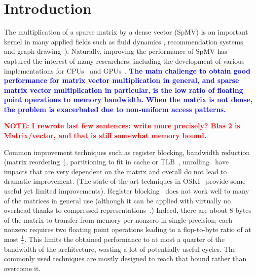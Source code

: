 \documentclass{sig-alternate}
\def\red#1{\textbf{\textcolor{red}{#1}}}
\def\blue#1{\textbf{\textcolor{blue}{#1}}}
\def\ge#1{{\blue{#1}}}
\def\NOTE#1{{\red{NOTE: #1}}}
\begin{document}
\section{Introduction}
The multiplication of a sparse matrix by a dense vector (SpMV) is an
important kernel in many applied fields such as fluid dynamics 
\cite{journals/tog/BolzFGS03}, recommendation systems~\cite{Brin98} and graph
drawing~\cite{Koren05}). Naturally, improving the performance of SpMV has
captured the interest of many researchers; including the development of
various implementations for 
CPUs~\cite{Buluc2009SPAA,Williams07} and GPUs~\cite{Bell08,
  conf/ipps/KreutzerHWFBB12,
  journals/concurrency/VazquezFG11,kumar2012accelerating}. \ge{The main
challenge  to obtain good performance for matrix vector multiplication in general, and 
sparse matrix vector multiplication in particular, is the low ratio of floating point operations
to memory bandwidth. When the matrix is not dense, the problem is exacerbated due to non-uniform 
access patterns.}

\NOTE{I rewrote last few sentences: write more precisely? Blas 2 is Matrix/vector, and that is still somewhat memory bound.}

Common improvement techniques such as register blocking, bandwidth
reduction (matrix reordering~\cite{Cuthill69}), partitioning to fit in
cache or TLB~\cite{Nishtala07,Temam:1992:CBS:147877.148091,conf/ppsc/Toledo97},
unrolling~\cite{Mellor-Crummey04} have impacts that are very
dependent on the matrix and overall do not lead to dramatic
improvement. (The state-of-the-art techniques in OSKI~\cite{Vuduc05}
provide some useful yet limited improvements). Register blocking~\cite{conf/ppsc/Toledo97} does
not work well to many of the matrices in general use (although it can be applied
with virtually no overhead thanks to compressed
representations~\cite{Buluc11}.) Indeed, there are about 8 bytes of the matrix to transfer
from memory 
per nonzero in single precision; each nonzero requires two
floating point operations leading to a flop-to-byte ratio of at most
$\frac{1}{4}$. This limits the obtained performance to at most a
quarter of the bandwidth of the architecture, wasting a lot of
potentially useful cycles. The commonly used techniques are mostly
designed to reach that bound rather than overcome it.
\end{document}
